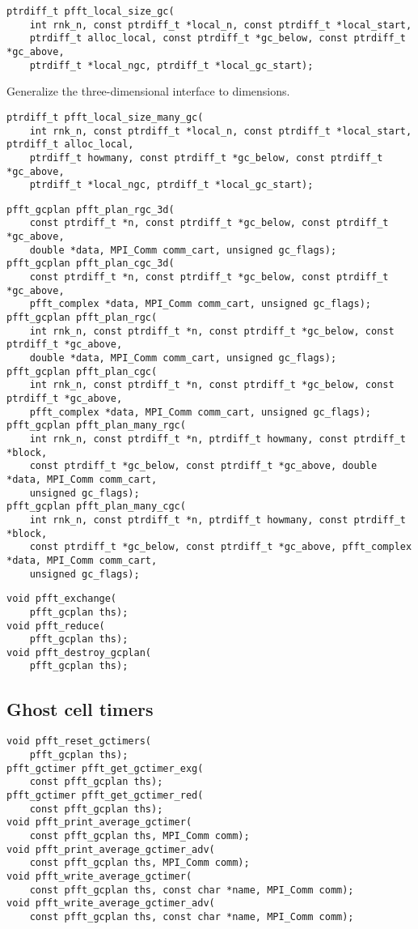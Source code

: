\begin{lstlisting}
ptrdiff_t pfft_local_size_gc(
    int rnk_n, const ptrdiff_t *local_n, const ptrdiff_t *local_start,
    ptrdiff_t alloc_local, const ptrdiff_t *gc_below, const ptrdiff_t *gc_above,
    ptrdiff_t *local_ngc, ptrdiff_t *local_gc_start);
\end{lstlisting}
Generalize the three-dimensional interface to  dimensions.
\begin{lstlisting}
ptrdiff_t pfft_local_size_many_gc(
    int rnk_n, const ptrdiff_t *local_n, const ptrdiff_t *local_start, ptrdiff_t alloc_local,
    ptrdiff_t howmany, const ptrdiff_t *gc_below, const ptrdiff_t *gc_above,
    ptrdiff_t *local_ngc, ptrdiff_t *local_gc_start);
\end{lstlisting}

\begin{lstlisting}
pfft_gcplan pfft_plan_rgc_3d(
    const ptrdiff_t *n, const ptrdiff_t *gc_below, const ptrdiff_t *gc_above,
    double *data, MPI_Comm comm_cart, unsigned gc_flags);
pfft_gcplan pfft_plan_cgc_3d(
    const ptrdiff_t *n, const ptrdiff_t *gc_below, const ptrdiff_t *gc_above,
    pfft_complex *data, MPI_Comm comm_cart, unsigned gc_flags);
pfft_gcplan pfft_plan_rgc(
    int rnk_n, const ptrdiff_t *n, const ptrdiff_t *gc_below, const ptrdiff_t *gc_above,
    double *data, MPI_Comm comm_cart, unsigned gc_flags);
pfft_gcplan pfft_plan_cgc(
    int rnk_n, const ptrdiff_t *n, const ptrdiff_t *gc_below, const ptrdiff_t *gc_above,
    pfft_complex *data, MPI_Comm comm_cart, unsigned gc_flags);
pfft_gcplan pfft_plan_many_rgc(
    int rnk_n, const ptrdiff_t *n, ptrdiff_t howmany, const ptrdiff_t *block,
    const ptrdiff_t *gc_below, const ptrdiff_t *gc_above, double *data, MPI_Comm comm_cart,
    unsigned gc_flags);
pfft_gcplan pfft_plan_many_cgc(
    int rnk_n, const ptrdiff_t *n, ptrdiff_t howmany, const ptrdiff_t *block,
    const ptrdiff_t *gc_below, const ptrdiff_t *gc_above, pfft_complex *data, MPI_Comm comm_cart,
    unsigned gc_flags);
\end{lstlisting}

\begin{lstlisting}
void pfft_exchange(
    pfft_gcplan ths);
void pfft_reduce(
    pfft_gcplan ths);
void pfft_destroy_gcplan(
    pfft_gcplan ths);
\end{lstlisting}

\subsection{Ghost cell timers}
\begin{lstlisting}
void pfft_reset_gctimers(
    pfft_gcplan ths);
pfft_gctimer pfft_get_gctimer_exg(
    const pfft_gcplan ths);
pfft_gctimer pfft_get_gctimer_red(
    const pfft_gcplan ths);
void pfft_print_average_gctimer(
    const pfft_gcplan ths, MPI_Comm comm);
void pfft_print_average_gctimer_adv(
    const pfft_gcplan ths, MPI_Comm comm);
void pfft_write_average_gctimer(
    const pfft_gcplan ths, const char *name, MPI_Comm comm);
void pfft_write_average_gctimer_adv(
    const pfft_gcplan ths, const char *name, MPI_Comm comm);
\end{lstlisting}

